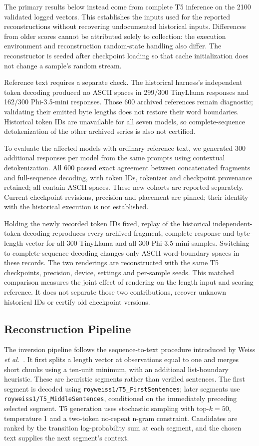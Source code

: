 \documentclass[electronics,article,submit,pdftex,moreauthors]{Definitions/mdpi}
\begin{document}
The primary results below instead come from complete T5 inference on the 2100 validated logged vectors. This establishes the inputs used for the reported reconstructions without recovering undocumented historical inputs. Differences from older scores cannot be attributed solely to collection: the execution environment and reconstruction random-state handling also differ. The reconstructor is seeded after checkpoint loading so that cache initialization does not change a sample's random stream.

Reference text requires a separate check. The historical harness's independent token decoding produced no ASCII spaces in 299/300 TinyLlama responses and 162/300 Phi-3.5-mini responses. Those 600 archived references remain diagnostic; validating their emitted byte lengths does not restore their word boundaries. Historical token IDs are unavailable for all seven models, so complete-sequence detokenization of the other archived series is also not certified.

To evaluate the affected models with ordinary reference text, we generated 300 additional responses per model from the same prompts using contextual detokenization. All 600 passed exact agreement between concatenated fragments and full-sequence decoding, with token IDs, tokenizer and checkpoint provenance retained; all contain ASCII spaces. These new cohorts are reported separately. Current checkpoint revisions, precision and placement are pinned; their identity with the historical execution is not established.

Holding the newly recorded token IDs fixed, replay of the historical independent-token decoding reproduces every archived fragment, complete response and byte-length vector for all 300 TinyLlama and all 300 Phi-3.5-mini samples. Switching to complete-sequence decoding changes only ASCII word-boundary spaces in these records. The two renderings are reconstructed with the same T5 checkpoints, precision, device, settings and per-sample seeds. This matched comparison measures the joint effect of rendering on the length input and scoring reference. It does not separate those two contributions, recover unknown historical IDs or certify old checkpoint versions.

\subsection{Reconstruction Pipeline}
The inversion pipeline follows the sequence-to-text procedure introduced by Weiss \emph{et al.}~\cite{weiss2024prompt}. It first splits a length vector at observations equal to one and merges short chunks using a ten-unit minimum, with an additional list-boundary heuristic. These are heuristic segments rather than verified sentences. The first segment is decoded using \texttt{royweiss1/T5\_FirstSentences}; later segments use \texttt{royweiss1/T5\_MiddleSentences}, conditioned on the immediately preceding selected segment. T5 generation uses stochastic sampling with top-$k=50$, temperature 1 and a two-token no-repeat n-gram constraint. Candidates are ranked by the transition log-probability sum at each segment, and the chosen text supplies the next segment's context.
\end{document}
